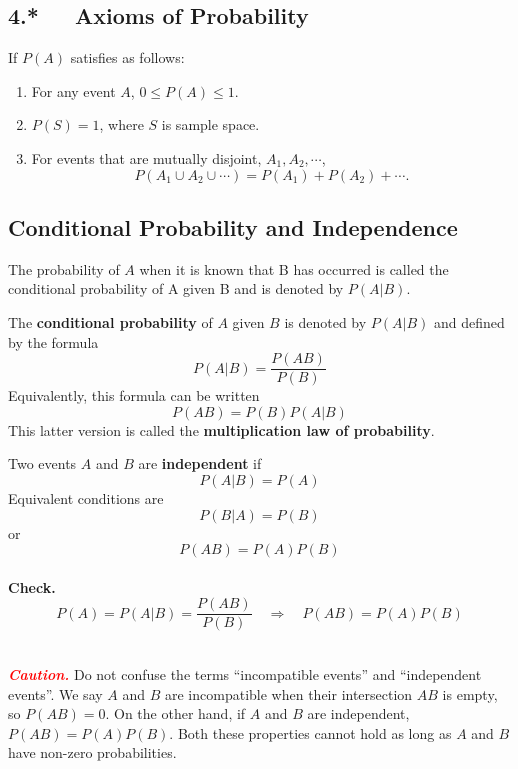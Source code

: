\documentclass[12pt,a4paper]{article}
\newcommand{\makedashline}{\hdashrule[0.5ex]{\linewidth}{0.5pt}{2mm}}
\begin{document}
\subsection*{4.*\ \ \ Axioms of Probability}
If $P(A)$ satisfies as follows: \begin{enumerate}
	\item For any event $A$, $0\leq P(A)\leq 1$.
	\item $P(S)=1$, where $S$ is sample space.
	\item For events that are mutually disjoint, $A_1,A_2,\cdots$, \[
	P(A_1\cup A_2\cup\cdots)=P(A_1)+P(A_2)+\cdots.
	\] 
\end{enumerate}

\subsection{Conditional Probability and Independence}
The probability of $A$ when it is known that B has occurred is called the conditional probability of A given B and is denoted by $P(A|B)$.
\begin{tcolorbox}[colback=white]
	The \textbf{conditional probability} of $A$ given $B$ is denoted by $P(A|B)$ and defined by the formula
	\[
	P(A|B) = \frac{P(AB)}{P(B)}
	\] Equivalently, this formula can be written \[
	P(AB) = P(B)P(A| B)
	\] This latter version is called the \textbf{multiplication law of probability}.
\end{tcolorbox}

\begin{tcolorbox}[colback=white]
	Two events $A$ and $B$ are \textbf{independent} if \[
	P(A|B) = P(A)
	\] 	 Equivalent conditions are \[
	P(B|A) = P(B)
	\] or \[
	P(AB) = P(A)P(B)
	\] \makedashline \\ \textbf{Check.} \[
	P(A)=P(A|B)=\frac{P(AB)}{P(B)}\quad\Longrightarrow\quad P(AB)=P(A)P(B)
	\]
\end{tcolorbox}\ \\
\textcolor{red}{\textbf{\textit{Caution.}}} Do not confuse the terms ``incompatible events'' and ``independent events''. We say $A$ and $B$ are incompatible when their intersection $AB$ is empty, so $P(AB)=0$. On the other hand, if $A$ and $B$ are independent, $P(AB)=P(A)P(B)$. Both these properties cannot hold as long as $A$ and $B$ have non-zero probabilities.
\end{document}
